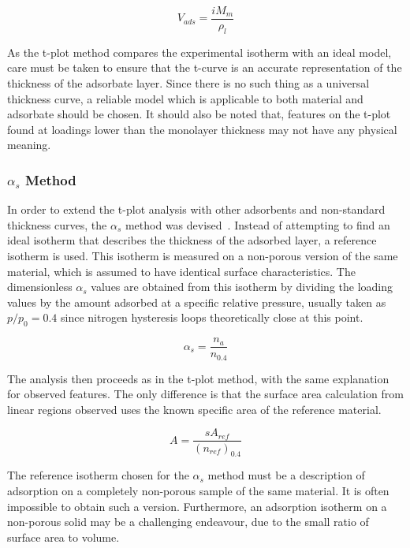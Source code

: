 \begin{equation}
	V_{ads} = \frac{i M_m}{\rho_{l}}
\end{equation}

As the t-plot method compares the experimental isotherm
with an ideal model, care must be taken to ensure that the t-curve
is an accurate representation of the thickness of the adsorbate layer.
Since there is no such thing as a universal thickness curve,
a reliable model which is applicable to both material and adsorbate
should be chosen. It should also be noted that, features on the t-plot
found at loadings lower than the monolayer thickness may not have any
physical meaning.

\subsubsection{\(\alpha_s\) Method}\label{pyg:charac:alphasplot}

In order to extend the t-plot analysis with other adsorbents and
non-standard thickness curves, the \(\alpha_s\) method was
devised~\cite{atkinsonAdsorptivePropertiesMicroporous1984}.
Instead of attempting to find an ideal isotherm that describes the
thickness of the adsorbed layer, a reference isotherm is used.
This isotherm is measured on a non-porous version of the same material,
which is assumed to have identical surface characteristics.
The dimensionless \(\alpha_s\) values are obtained from this isotherm by
dividing the loading values by the amount adsorbed at a specific relative
pressure, usually taken as \(p/p_0=0.4\) since nitrogen hysteresis loops
theoretically close at this point.

\begin{equation}
	\alpha_s = \frac{n_a}{n_{0.4}}
\end{equation}

The analysis then proceeds as in the t-plot method, with the
same explanation for observed features. The only difference is
that the surface area calculation from linear regions observed
uses the known specific area of the reference material.

\begin{equation}
	A = \frac{s A_{ref}}{(n_{ref})_{0.4}}
\end{equation}

The reference isotherm chosen for the \(\alpha_s\) method must
be a description of adsorption on a completely non-porous sample
of the same material. It is often impossible to obtain such
a version. Furthermore, an adsorption isotherm on a non-porous
solid may be a challenging endeavour, due to the small ratio
of surface area to volume.
